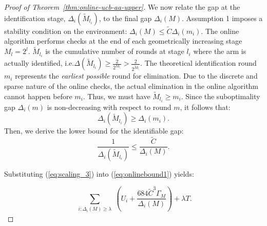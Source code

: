 \documentclass[
  12pt]{article}
\begin{document}
\begin{proof}[Proof of Theorem~\ref{thm:online-ucb-aa-upper}]
We now relate the gap at the identification stage, $\Delta_i(\tilde{M}_{l_i})$, to the final gap $\Delta_i(M)$. 
Assumption 1 imposes a stability condition on the environment: $\Delta_i(M) \le \tilde{C} \Delta_i(m_i)$. 
The online algorithm performs checks at the end of each geometrically increasing stage $M_l = 2^l$.  $\tilde{M}_{l_i}$ is the cumulative number of rounds at stage $l_i$ where the arm is actually identified, i.e.$\Delta(\tilde{M}_{l_i})\geq \frac{2}{2^{M_{l_i}}} > \frac{2}{2^{\tilde{M}_{l_i}}} $.
The theoretical identification round $m_i$ represents the \textit{earliest possible} round for elimination. Due to the discrete and sparse nature of the online checks, the actual elimination in the online algorithm cannot happen before $m_i$. Thus, we must have $\tilde{M}_{l_i} \ge m_i$. Since the suboptimality gap $\Delta_i(m)$ is non-decreasing with respect to round $m$, it follows that:
    \begin{equation*} \label{eq:scaling_2}
        \Delta_i(\tilde{M}_{l_i}) \ge \Delta_i(m_i).
    \end{equation*}
 Then, we derive the lower bound for the identifiable gap:
    \begin{equation}
    \label{eq:scaling_3}
        \frac{1}{\Delta_i(\tilde{M}_{l_i})} \le \frac{\tilde{C}}{\Delta_i(M)}.
    \end{equation}

Substituting (\ref{eq:scaling_3}) into (\ref{eq:onlinebound1}) yields:

\begin{equation*}
\sum_{\substack{i: \Delta_i(M) \geq \lambda}}
\left(
U_i
+\frac{684 \tilde{C}^3\Gamma_M}{\Delta_i(M)}
\right)+\lambda T.
\end{equation*}  
\end{proof}
\end{document}

